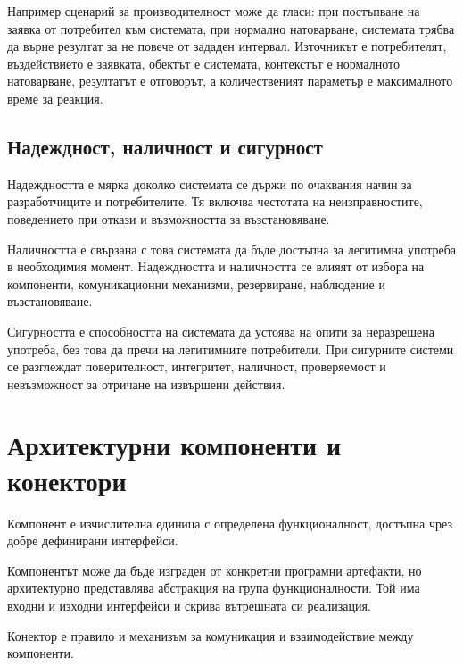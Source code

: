 Например сценарий за производителност може да гласи: при постъпване на заявка от потребител към системата, при нормално натоварване, системата трябва да върне резултат за не повече от зададен интервал. Източникът е потребителят, въздействието е заявката, обектът е системата, контекстът е нормалното натоварване, резултатът е отговорът, а количественият параметър е максималното време за реакция.

\subsection{Надеждност, наличност и сигурност}\label{s:27.2.1}

\begin{defn}[Надеждност]
Надеждността е мярка доколко системата се държи по очаквания начин за разработчиците и потребителите. Тя включва честотата на неизправностите, поведението при откази и възможността за възстановяване.
\end{defn}

Наличността е свързана с това системата да бъде достъпна за легитимна употреба в необходимия момент. Надеждността и наличността се влияят от избора на компоненти, комуникационни механизми, резервиране, наблюдение и възстановяване.

Сигурността е способността на системата да устоява на опити за неразрешена употреба, без това да пречи на легитимните потребители. При сигурните системи се разглеждат поверителност, интегритет, наличност, проверяемост и невъзможност за отричане на извършени действия.

\section{Архитектурни компоненти и конектори}\label{s:27.3}

\begin{defn}
Компонент е изчислителна единица с определена функционалност, достъпна чрез добре дефинирани интерфейси.
\end{defn}

Компонентът може да бъде изграден от конкретни програмни артефакти, но архитектурно представлява абстракция на група функционалности. Той има входни и изходни интерфейси и скрива вътрешната си реализация.

\begin{defn}
Конектор е правило и механизъм за комуникация и взаимодействие между компоненти.
\end{defn}


